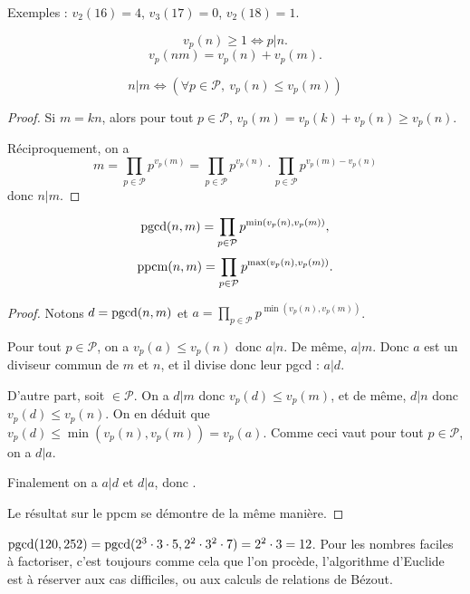 Exemples : $v_2(16)=4$, $v_3(17)=0$, $v_2(18)=1$.

\begin{proposition}
\[ v_p(n)\geq 1 \iff p|n.\]
\[ v_p(nm) = v_p(n)+v_p(m).\]
\end{proposition}

\begin{proposition}
\[ 
n|m \iff \left(\forall p\in \mathcal P, \: v_p(n)\leq v_p(m)\right)
\]
\end{proposition}
\begin{proof}
Si $m = kn$, alors pour tout $p\in \mathcal P$, $v_p(m) = v_p(k)+v_p(n) \geq v_p(n)$.

Réciproquement, on a 
\[ 
m
= \prod_{p\in\mathcal P}p^{v_p(m)}
= \prod_{p\in\mathcal P}p^{v_p(n)} \cdot \prod_{p\in\mathcal P}p^{v_p(m)-v_p(n)}
\]
donc $n|m$.
\end{proof}

\begin{corollaire}
\[
\operatorname{pgcd}(n,m) = \prod_{p\in\mathcal P}p^{\min(v_p(n),v_p(m))},
\]
\[
\operatorname{ppcm}(n,m) = \prod_{p\in\mathcal P}p^{\max(v_p(n),v_p(m))}.
\]
\end{corollaire}
\begin{proof}
Notons $d=\operatorname{pgcd}(n,m)$ et $a = \prod_{p\in\mathcal P}p^{\min(v_p(n),v_p(m))}$.

Pour tout $p\in \mathcal P$, on a $v_p(a) \leq v_p(n)$ donc $a|n$. De même, $a|m$. Donc $a$ est un diviseur commun de $m$ et $n$, et il divise donc leur pgcd : $a|d$.

D'autre part, soit $\in \mathcal P$. On a $d|m$ donc $v_p(d)\leq v_p(m)$, et de même, $d|n$ donc $v_p(d)\leq v_p(n)$. On en déduit que $v_p(d) \leq \min(v_p(n),v_p(m)) = v_p(a)$. Comme ceci vaut pour tout $p\in \mathcal P$, on a $d|a$.

Finalement on a $a|d$ et $d|a$, donc .

Le résultat sur le ppcm se démontre de la même manière.
\end{proof}

\begin{exemple}
$\operatorname{pgcd}(120,252)=\operatorname{pgcd}(2^3\cdot 3\cdot 5,2^2\cdot 3^2\cdot 7) =2^2\cdot 3=12$. Pour les nombres faciles à factoriser, c'est toujours comme cela que l'on procède, l'algorithme d'Euclide est à réserver aux cas difficiles, ou aux calculs de relations de Bézout.
\end{exemple}


